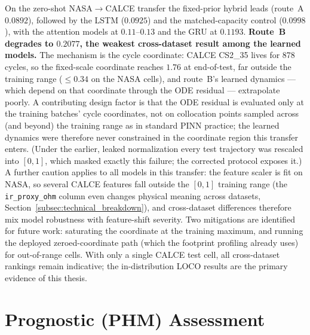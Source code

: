 On the zero-shot NASA$\rightarrow$CALCE transfer the fixed-prior hybrid leads
(route~A $0.0892$), followed by the LSTM ($0.0925$) and the matched-capacity
control ($0.0998$), with the attention models at $0.11$--$0.13$ and the GRU at
$0.1193$. \textbf{Route~B degrades to $0.2077$, the
weakest cross-dataset result among the learned models.} The mechanism is the
cycle coordinate: CALCE CS2\_35 lives for 878 cycles, so the fixed-scale
coordinate reaches $1.76$ at end-of-test, far outside the training range
($\le0.34$ on the NASA cells), and route~B's learned dynamics --- which depend
on that coordinate through the ODE residual --- extrapolate poorly. A
contributing design factor is that the ODE residual is evaluated only at the
training batches' cycle coordinates, not on collocation points sampled across
(and beyond) the training range as in standard PINN practice; the learned
dynamics were therefore never constrained in the coordinate region this
transfer enters. (Under the
earlier, leaked normalization every test trajectory was rescaled into $[0,1]$,
which masked exactly this failure; the corrected protocol exposes it.) A
further caution applies to all models in this transfer: the feature scaler is
fit on NASA, so several CALCE features fall outside the $[0,1]$ training range
(the \texttt{ir\_proxy\_ohm} column even changes physical meaning across
datasets, Section~\ref{subsec:technical_breakdown}), and cross-dataset differences therefore mix model
robustness with feature-shift severity. Two mitigations are identified for
future work: saturating the coordinate at the training maximum, and running the
deployed zeroed-coordinate path (which the footprint profiling already uses)
for out-of-range cells. With only a single CALCE test cell, all cross-dataset
rankings remain indicative; the in-distribution LOCO results are the primary
evidence of this thesis.

\section{Prognostic (PHM) Assessment}
\label{sec:phm}

